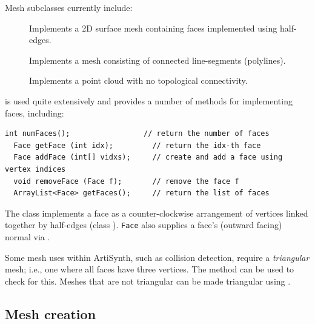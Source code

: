 Mesh subclasses currently include:

\begin{description}

\item[]\mbox{}

Implements a 2D surface
mesh containing faces implemented using half-edges.

\item[]\mbox{}

Implements a mesh
consisting of connected line-segments (polylines).

\item[]\mbox{}

Implements a point cloud with
no topological connectivity.

\end{description}

 is used quite extensively
and provides a number of methods for implementing faces, including:
\begin{lstlisting}[]
  int numFaces();                 // return the number of faces
  Face getFace (int idx);         // return the idx-th face
  Face addFace (int[] vidxs);     // create and add a face using vertex indices
  void removeFace (Face f);       // remove the face f
  ArrayList<Face> getFaces();     // return the list of faces
\end{lstlisting}
%
The class  implements a face as a
counter-clockwise arrangement of vertices linked together by
half-edges (class ).
{\tt Face} also supplies a face's (outward facing) normal
via 
.

Some mesh uses within ArtiSynth, such as collision detection, require a
{\it triangular} mesh; i.e., one where all faces have three vertices.
The method 
can be used to check for this. Meshes that are not triangular can be
made triangular using 
.

\subsection{Mesh creation}
\label{MeshCreation:sec}

